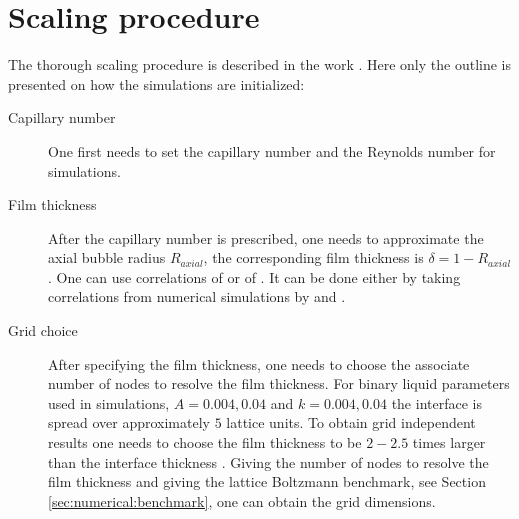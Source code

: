 \documentclass{article}
\begin{document}
\section{Scaling procedure}
\label{append:scaling}
The thorough scaling procedure is described in the work \cite{kuzmin-binary2d}. Here only the
outline is presented on how the simulations are initialized:
\begin{description}
 \item[Capillary number] One first needs to set the capillary number and the Reynolds number for
simulations. 
 \item[Film thickness] After the capillary number is prescribed, one needs to approximate the axial
bubble radius $R_{axial}$, the corresponding film thickness is $\delta=1-R_{axial}$. One can use
correlations of \citet{shikazono-square} or of \citet{kreutzer-taylor}. It can be done either by
taking correlations from numerical simulations by
\citet{heil-bretherton} and \citet{giavedoni-numerical}.  
\item[Grid choice] After specifying the film thickness, one needs to choose the associate
number of nodes to resolve the film thickness. For binary liquid parameters used in simulations,
$A=0.004,0.04$ and $k=0.004,0.04$ the
interface is spread over approximately $5$ lattice units. To obtain grid independent results one
needs to choose the
film thickness to be $2-2.5$ times larger than the interface thickness \cite{kuzmin-binary2d}.
Giving the number of nodes to resolve the film thickness and giving the lattice Boltzmann
benchmark, see Section \ref{sec:numerical:benchmark}, one can obtain the grid dimensions.


\end{description}
\end{document}
